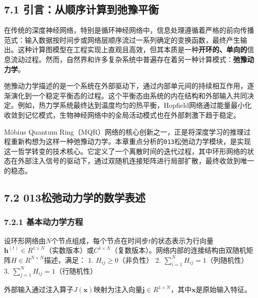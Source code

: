\documentclass[
  12pt,
]{article}
\begin{document}
\hypertarget{ux5f15ux8a00ux4eceux987aux5e8fux8ba1ux7b97ux5230ux5f1bux8c6bux5e73ux8861}{%
\subsection{7.1
引言：从顺序计算到弛豫平衡}\label{ux5f15ux8a00ux4eceux987aux5e8fux8ba1ux7b97ux5230ux5f1bux8c6bux5e73ux8861}}

在传统的深度神经网络，特别是循环神经网络中，信息处理遵循着严格的前向传播范式：输入数据按时间步或网络层顺序流过一系列确定的变换函数，最终产生输出。这种计算图模型在工程实现上直观且高效，但其本质是一种\textbf{开环的、单向的}信息流动过程。然而，自然界和许多复杂系统中普遍存在着另一种计算模式：\textbf{弛豫动力学}。

弛豫动力学描述的是一个系统在外部驱动下，通过内部单元间的持续相互作用，逐渐演化到一个稳定平衡态的过程。这个平衡态由系统的内在结构和外部输入共同决定。例如，热力学系统最终达到温度均匀的热平衡，Hopfield网络通过能量最小化收敛到记忆模式，生物神经网络中的全局活动模式也在外部刺激下趋于稳定。

Möbius Quantum
Ring（MQR）网络的核心创新之一，正是将深度学习的推理过程重新构想为这样一种弛豫动力学。本章重点分析的\texttt{013}松弛动力学模块，是实现这一哲学转变的技术核心。它定义了一个离散时间的迭代过程，其中环形网络的状态在外部注入信号的驱动下，通过双随机连接矩阵进行局部扩散，最终收敛到唯一的稳态。

\hypertarget{ux677eux5f1bux52a8ux529bux5b66ux7684ux6570ux5b66ux8868ux8ff0}{%
\subsection{7.2
013松弛动力学的数学表述}\label{ux677eux5f1bux52a8ux529bux5b66ux7684ux6570ux5b66ux8868ux8ff0}}

\hypertarget{ux57faux672cux52a8ux529bux5b66ux65b9ux7a0b-2}{%
\subsubsection{7.2.1
基本动力学方程}\label{ux57faux672cux52a8ux529bux5b66ux65b9ux7a0b-2}}

设环形网络由\(N\)个节点组成，每个节点在时间步\(t\)的状态表示为行向量\(\textbf{h}^{(t)} \in R^{1 \times N}\)（实数版本）或\(C^{1 \times N}\)（复数版本）。网络内部的连接结构由双随机矩阵\(H \in R^{N \times N}\)描述，满足：
1. \(H_{ij} \geq 0\)（非负性） 2.
\(\sum_{i=1}^N H_{ij} = 1\)（列随机性） 3.
\(\sum_{j=1}^N H_{ij} = 1\)（行随机性）

外部输入通过注入算子\(J(\textbf{x})\)映射为注入向量\(\textbf{j} \in R^{1 \times N}\)，其中\(\textbf{x}\)是原始输入特征。
\end{document}

